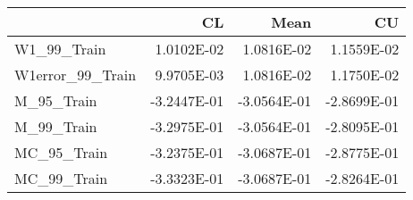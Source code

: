 \begin{tabular}{lrrr}
\toprule
{} &          CL &        Mean &          CU \\
\midrule
W1\_99\_Train      &  1.0102E-02 &  1.0816E-02 &  1.1559E-02 \\
W1error\_99\_Train &  9.9705E-03 &  1.0816E-02 &  1.1750E-02 \\
M\_95\_Train       & -3.2447E-01 & -3.0564E-01 & -2.8699E-01 \\
M\_99\_Train       & -3.2975E-01 & -3.0564E-01 & -2.8095E-01 \\
MC\_95\_Train      & -3.2375E-01 & -3.0687E-01 & -2.8775E-01 \\
MC\_99\_Train      & -3.3323E-01 & -3.0687E-01 & -2.8264E-01 \\
\bottomrule
\end{tabular}
